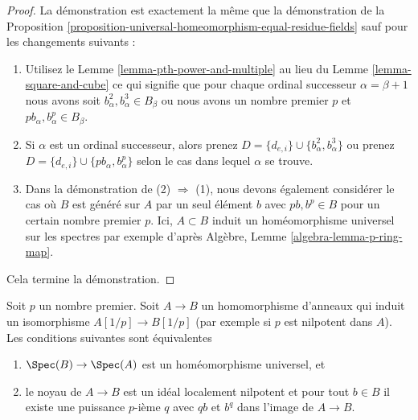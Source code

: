 \begin{proof}
La démonstration est exactement la même
que la démonstration de la Proposition \ref{proposition-universal-homeomorphism-equal-residue-fields} sauf pour
les changements suivants :
\begin{enumerate}
\item Utilisez le Lemme \ref{lemma-pth-power-and-multiple} au lieu du Lemme
\ref{lemma-square-and-cube} ce qui signifie que pour chaque ordinal
successeur $\alpha = \beta + 1$ nous avons
soit $b_\alpha^2, b_\alpha^3 \in B_\beta$ ou nous avons un nombre premier
$p$ et $pb_\alpha, b_\alpha^p \in B_\beta$.
\item Si $\alpha$ est un ordinal successeur,
alors prenez $D = \{d_{e, i}\} \cup \{b_\alpha^2, b_\alpha^3\}$ ou
prenez $D = \{d_{e, i}\} \cup \{pb_\alpha, b_\alpha^p\}$ selon le cas dans lequel
$\alpha$ se trouve.
\item Dans la démonstration de (2) $\Rightarrow$ (1), nous devons également considérer
le cas où $B$ est généré sur $A$ par un seul élément
$b$ avec $pb, b^p \in B$ pour un certain nombre premier $p$.
Ici, $A \subset B$ induit un homéomorphisme universel sur les spectres
par exemple d'après Algèbre, Lemme \ref{algebra-lemma-p-ring-map}.
\end{enumerate}
Cela termine la démonstration.
\end{proof}

\begin{lemma}
\label{lemma-universal-homeo-iso-if-invert-p}
Soit $p$ un nombre premier. Soit $A \to B$ un homomorphisme d'anneaux
qui induit un isomorphisme $A[1/p] \to B[1/p]$ (par exemple si
$p$ est nilpotent dans $A$). Les conditions
suivantes sont équivalentes
\begin{enumerate}
\item $\Spec(B) \to \Spec(A)$ est un homéomorphisme universel, et
\item le noyau de $A \to B$ est un idéal localement nilpotent et pour tout $b \in B$
il existe une puissance $p$-ième $q$ avec $qb$ et $b^q$
dans l'image de $A \to B$.
\end{enumerate}
\end{lemma}

